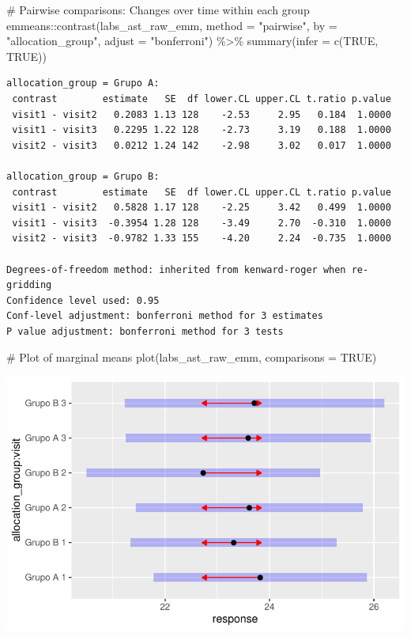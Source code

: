 \documentclass[
  12pt,
]{article}
\newenvironment{Shaded}{\begin{snugshade}}{\end{snugshade}}
\newcommand{\AttributeTok}[1]{\textcolor[rgb]{0.40,0.45,0.13}{#1}}
\newcommand{\CommentTok}[1]{\textcolor[rgb]{0.37,0.37,0.37}{#1}}
\newcommand{\ConstantTok}[1]{\textcolor[rgb]{0.56,0.35,0.01}{#1}}
\newcommand{\FunctionTok}[1]{\textcolor[rgb]{0.28,0.35,0.67}{#1}}
\newcommand{\NormalTok}[1]{\textcolor[rgb]{0.00,0.23,0.31}{#1}}
\newcommand{\SpecialCharTok}[1]{\textcolor[rgb]{0.37,0.37,0.37}{#1}}
\newcommand{\StringTok}[1]{\textcolor[rgb]{0.13,0.47,0.30}{#1}}
\begin{document}
\begin{Shaded}
\begin{Highlighting}[]
\CommentTok{\# Pairwise comparisons: Changes over time within each group}
\NormalTok{emmeans}\SpecialCharTok{::}\FunctionTok{contrast}\NormalTok{(labs\_ast\_raw\_emm,}
\AttributeTok{method =} \StringTok{"pairwise"}\NormalTok{, }\AttributeTok{by =} \StringTok{"allocation\_group"}\NormalTok{,}
\AttributeTok{adjust =} \StringTok{"bonferroni"}\NormalTok{) }\SpecialCharTok{\%\textgreater{}\%} \FunctionTok{summary}\NormalTok{(}\AttributeTok{infer =} \FunctionTok{c}\NormalTok{(}\ConstantTok{TRUE}\NormalTok{, }\ConstantTok{TRUE}\NormalTok{))}
\end{Highlighting}
\end{Shaded}

\begin{verbatim}
allocation_group = Grupo A:
 contrast        estimate   SE  df lower.CL upper.CL t.ratio p.value
 visit1 - visit2   0.2083 1.13 128    -2.53     2.95   0.184  1.0000
 visit1 - visit3   0.2295 1.22 128    -2.73     3.19   0.188  1.0000
 visit2 - visit3   0.0212 1.24 142    -2.98     3.02   0.017  1.0000

allocation_group = Grupo B:
 contrast        estimate   SE  df lower.CL upper.CL t.ratio p.value
 visit1 - visit2   0.5828 1.17 128    -2.25     3.42   0.499  1.0000
 visit1 - visit3  -0.3954 1.28 128    -3.49     2.70  -0.310  1.0000
 visit2 - visit3  -0.9782 1.33 155    -4.20     2.24  -0.735  1.0000

Degrees-of-freedom method: inherited from kenward-roger when re-gridding 
Confidence level used: 0.95 
Conf-level adjustment: bonferroni method for 3 estimates 
P value adjustment: bonferroni method for 3 tests 
\end{verbatim}

\begin{Shaded}
\begin{Highlighting}[]
\CommentTok{\# Plot of marginal means}
\FunctionTok{plot}\NormalTok{(labs\_ast\_raw\_emm, }\AttributeTok{comparisons =} \ConstantTok{TRUE}\NormalTok{)}
\end{Highlighting}
\end{Shaded}

\includegraphics{Outcomes_files/figure-pdf/labs_ast_raw_emm-1.pdf}
\end{document}
